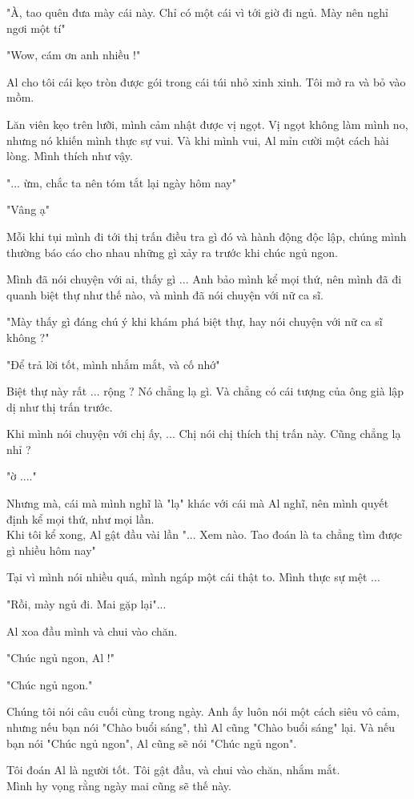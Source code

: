 "À, tao quên đưa mày cái này. Chỉ có một cái vì tới giờ đi ngủ. Mày nên nghỉ ngơi một tí"

"Wow, cám ơn anh nhiều !"

Al cho tôi cái kẹo tròn được gói trong cái túi nhỏ xinh xinh. Tôi mở ra và bỏ vào mồm.

Lăn viên kẹo trên lưỡi, mình cảm nhật được vị ngọt. Vị ngọt không làm mình no, nhưng nó khiến mình thực sự vui. Và khi mình vui, Al mỉn cười một cách hài lòng. Mình thích như vậy.

"... ừm, chắc ta nên tóm tắt lại ngày hôm nay"

"Vâng ạ"

Mỗi khi tụi mình đi tới thị trấn điều tra gì đó và hành động độc lập, chúng mình thường báo cáo cho nhau những gì xảy ra trước khi chúc ngủ ngon.

Mình đã nói chuyện với ai, thấy gì ... Anh bảo mình kể mọi thứ, nên mình đã đi quanh biệt thự như thế nào, và mình đã nói chuyện với nữ ca sĩ.

"Mày thấy gì đáng chú ý khi khám phá biệt thự, hay nói chuyện với nữ ca sĩ không ?"

"Để trả lời tốt, mình nhắm mắt, và cố nhớ"

Biệt thự này rất ... rộng ? Nó chẳng lạ gì. Và chẳng có cái tượng của ông già lập dị như thị trấn trước.

Khi mình nói chuyện với chị ấy, ... Chị nói chị thích thị trấn này. Cũng chẳng lạ nhỉ ?

"ờ ...."

Nhưng mà, cái mà mình nghĩ là "lạ" khác với cái mà Al nghĩ, nên mình quyết định kể mọi thứ, như mọi lần. \\


Khi tôi kể xong, Al gật đầu vài lần "... Xem nào. Tao đoán là ta chẳng tìm được gì nhiều hôm nay"

Tại vì mình nói nhiều quá, mình ngáp một cái thật to. Mình thực sự mệt ...

"Rồi, mày ngủ đi. Mai gặp lại"...

Al xoa đầu mình và chui vào chăn.

"Chúc ngủ ngon, Al !"

"Chúc ngủ ngon."

Chúng tôi nói câu cuối cùng trong ngày. Anh ấy luôn nói một cách siêu vô cảm, nhưng nếu bạn nói "Chào buổi sáng", thì Al cũng "Chào buổi sáng" lại. Và nếu bạn nói "Chúc ngủ ngon", Al cũng sẽ nói "Chúc ngủ ngon".

Tôi đoán Al là người tốt. Tôi gật đầu, và chui vào chăn, nhắm mắt.\\

Mình hy vọng rằng ngày mai cũng sẽ thế này. \\




